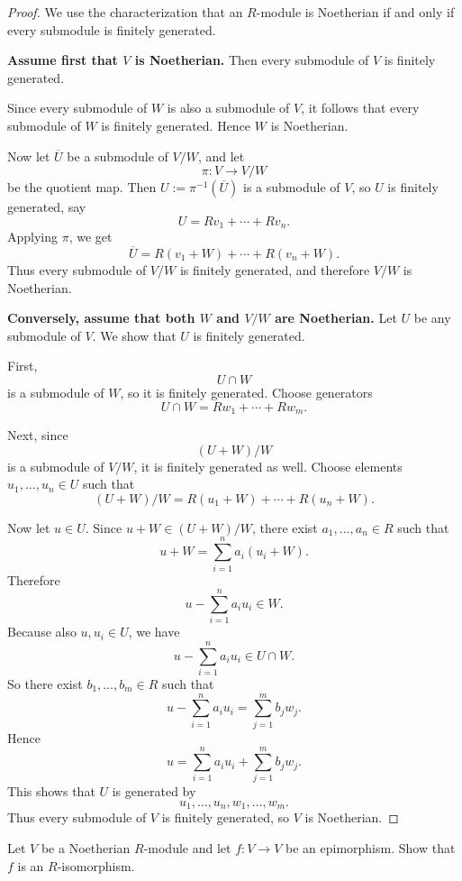 \begin{proof}
    We use the characterization that an $R$-module is Noetherian if and only if every submodule is finitely generated.

    \medskip
    \noindent\textbf{Assume first that $V$ is Noetherian.}
    Then every submodule of $V$ is finitely generated.

    Since every submodule of $W$ is also a submodule of $V$, it follows that every submodule of $W$ is finitely generated.
    Hence $W$ is Noetherian.

    Now let $\overline{U}$ be a submodule of $V/W$, and let
    \[
        \pi\colon V\to V/W
    \]
    be the quotient map.
    Then $U:=\pi^{-1}(\overline{U})$ is a submodule of $V$, so $U$ is finitely generated, say
    \[
        U=Rv_1+\cdots+Rv_n.
    \]
    Applying $\pi$, we get
    \[
        \overline{U}=R(v_1+W)+\cdots+R(v_n+W).
    \]
    Thus every submodule of $V/W$ is finitely generated, and therefore $V/W$ is Noetherian.

    \medskip
    \noindent\textbf{Conversely, assume that both $W$ and $V/W$ are Noetherian.}
    Let $U$ be any submodule of $V$.
    We show that $U$ is finitely generated.

    First,
    \[
        U\cap W
    \]
    is a submodule of $W$, so it is finitely generated.
    Choose generators
    \[
        U\cap W=Rw_1+\cdots+Rw_m.
    \]

    Next, since
    \[
        (U+W)/W
    \]
    is a submodule of $V/W$, it is finitely generated as well.
    Choose elements $u_1,\dots,u_n\in U$ such that
    \[
        (U+W)/W
        =
        R(u_1+W)+\cdots+R(u_n+W).
    \]

    Now let $u\in U$.
    Since $u+W\in (U+W)/W$, there exist $a_1,\dots,a_n\in R$ such that
    \[
        u+W=\sum_{i=1}^n a_i(u_i+W).
    \]
    Therefore
    \[
        u-\sum_{i=1}^n a_i u_i\in W.
    \]
    Because also $u,u_i\in U$, we have
    \[
        u-\sum_{i=1}^n a_i u_i\in U\cap W.
    \]
    So there exist $b_1,\dots,b_m\in R$ such that
    \[
        u-\sum_{i=1}^n a_i u_i=\sum_{j=1}^m b_j w_j.
    \]
    Hence
    \[
        u=\sum_{i=1}^n a_i u_i+\sum_{j=1}^m b_j w_j.
    \]
    This shows that $U$ is generated by
    \[
        u_1,\dots,u_n,w_1,\dots,w_m.
    \]
    Thus every submodule of $V$ is finitely generated, so $V$ is Noetherian.
\end{proof}

\begin{exercise}
    Let $V$ be a Noetherian $R$-module and let $f\colon V\to V$ be an epimorphism. Show that $f$ is an $R$-isomorphism.
\end{exercise}

